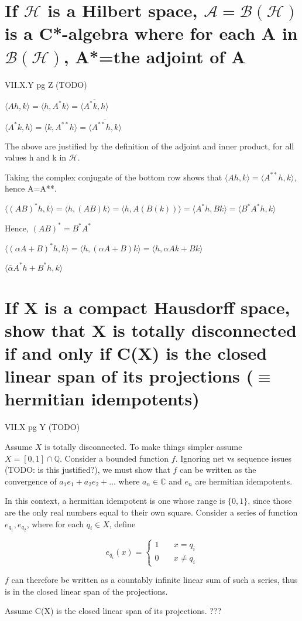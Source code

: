 \documentclass{article}
\begin{document}
\section{If $\mathscr{H}$ is a Hilbert space, $\mathscr{A}=\mathscr{B}(\mathscr{H} )$ is a C*-algebra where for each A in $\mathscr{B}(\mathscr{H} )$, A*=the adjoint of A}

VII.X.Y pg Z (TODO)

$\langle Ah, k \rangle = \langle h, A^*k \rangle = \overline{ \langle A^*k,h \rangle}$

$\langle A^*k, h \rangle = \langle k, A^{**}h \rangle = \overline{\langle A^{**}h,k \rangle}$

The above are justified by the definition of the adjoint and inner product, for all values h and k in $\mathscr{H}$.

Taking the complex conjugate of the bottom row shows that $\langle Ah, k \rangle = \langle A^{**}h,k \rangle$, hence A=A**.

$\langle (AB)^*h, k \rangle = \langle h, (AB)k \rangle = \langle h, A(B(k)) \rangle = \langle A^* h, B k \rangle = \langle B^*A^*h,k \rangle$

Hence, $(AB)^* = B^*A^*$

$\langle (\alpha A + B)^*h,k \rangle = \langle h, (\alpha A + B) k \rangle = \langle h, \alpha A k + B k \rangle$

$\langle \bar{\alpha}A^*h+B^*h, k \rangle$


\section{If X is a compact Hausdorff space, show that X is totally disconnected if and only if C(X) is the closed linear span of its projections ($\equiv$ hermitian idempotents)}

VII.X pg Y (TODO)

Assume $X$ is totally disconnected. To make things simpler assume $X=[0,1] \cap \mathbb{Q}$. Consider a bounded function $f$. Ignoring net vs sequence issues (TODO: is this justified?), we must show that $f$ can be written as the convergence of $a_1 e_1 + a_2 e_2 + ... $ where $a_n \in \mathbb{C}$ and $e_n$ are hermitian idempotents.

In this context, a hermitian idempotent is one whose range is $\{0,1\}$, since those are the only real numbers equal to their own square. Consider a series of function $e_{q_1}, e_{q_2}$, where for each ${q_i} \in X$, define

\begin{equation*}
e_{q_i}(x)= \left\{
        \begin{array}{ll}
            1 & \quad x = q_i \\
            0 & \quad x \ne q_i
        \end{array}
    \right.
\end{equation*}

$f$ can therefore be written as a countably infinite linear sum of such a series, thus is in the closed linear span of the projections.

Assume C(X) is the closed linear span of its projections. ???
\end{document}
